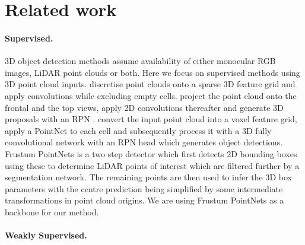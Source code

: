 \section{Related work}\label{s:related}



\paragraph{Supervised.}

3D object detection methods assume availability of either monocular RGB images, LiDAR point clouds or both. Here we focus on supervised methods using 3D point cloud inputs. \cite{wang2015voting,engelcke2017vote3deep} discretise point clouds onto a sparse 3D feature grid and apply convolutions while excluding empty cells. \cite{chen2017multiview} project the point cloud onto the frontal and the top views, apply 2D convolutions thereafter and generate 3D proposals with an RPN \cite{ren16faster}. \cite{zhou2018voxelnet} convert the input point cloud into a voxel feature grid, apply a PointNet \cite{qi16pointnet:} to each cell and subsequently process it with a 3D fully convolutional network with an RPN head which generates object detections.
Frustum PointNets \cite{qi2017frustum} is a two step detector which first detects 2D bounding boxes using these to determine LiDAR points of interest which are filtered further by a segmentation network. The remaining points are then used to infer the 3D box parameters with the centre prediction being simplified by some intermediate transformations in point cloud origins. We are using Frustum PointNets as a backbone for our method.

\paragraph{Weakly Supervised.}

